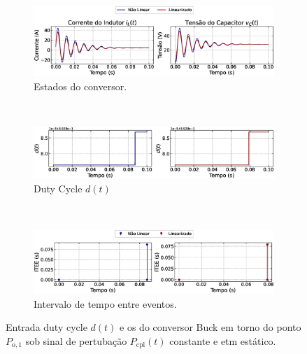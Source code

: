 \begin{figure}[H]
  \centering
  \captionsetup{justification=centering}
  \begin{subfigure}{1.\textwidth}
    \centering
    \includegraphics[width=1.\textwidth]{figuras/static-etm/buck/sim1/op1/result.eps}
    \caption{Estados do conversor.}
    \label{fig:buck_converter_constant_pcpl_static_etm_op1_duty_a}
  \end{subfigure}
  \\[6pt]
  \begin{subfigure}{1.\textwidth}
    \centering
    \includegraphics[width=1.\textwidth]{figuras/static-etm/buck/sim1/op1/duty-cycle.eps}
    \caption{Duty Cycle $d(t)$}
    \label{fig:buck_converter_constant_pcpl_static_etm_op1_duty_b}
  \end{subfigure}
  \\[6pt]
  \begin{subfigure}{1.\textwidth}
    \centering
    \includegraphics[width=1.\textwidth]{figuras/static-etm/buck/sim1/op1/inter-event-times.eps}
    \caption{Intervalo de tempo entre eventos.}
    \label{fig:buck_converter_constant_pcpl_static_etm_op1_duty_c}
  \end{subfigure}
  \caption{Entrada duty cycle $d(t)$ e os  do conversor Buck em torno do ponto $P_{\mathrm{o}, 1}$ sob sinal de pertubação $P_{\mathrm{cpl}}(t)$ constante e \acrshort{etm} estático.}
\end{figure}

